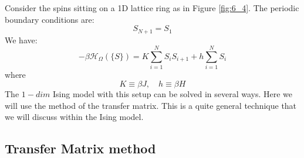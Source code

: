 \documentclass[../../Main/Main.tex]{subfiles}
\begin{document}
Consider the spins sitting on a 1D lattice ring as in Figure \ref{fig:6_4}. The periodic boundary conditions are:
\begin{equation*}
  S_{N+1}=S_1
\end{equation*}
We have:
\begin{equation}
  -\beta \mathcal{H}_ \Omega  ( \{ S \}  ) = K \sum_{i=1}^{N} S_i S_{i+1} + h \sum_{i=1}^{N} S_i
  \label{eq:6_6}
\end{equation}
where
\begin{equation*}
   K \equiv \beta J,  \quad h \equiv \beta H
\end{equation*}
The \( 1-dim \) Ising model with this setup can be solved in several ways. Here we will use the method of the transfer matrix. This is a quite general technique that we will discuss within the Ising model.









\subsection{Transfer Matrix method}
\end{document}

